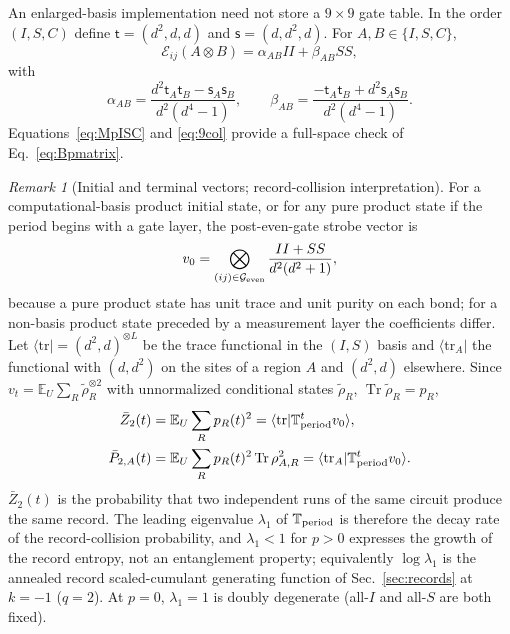 \documentclass[aps,prx,reprint,superscriptaddress,nobibnotes,longbibliography]{revtex4-2}
\theoremstyle{remark}
\newtheorem{remark}{Remark}
\newcommand{\Tr}{\operatorname{Tr}}
\newcommand{\E}{\mathbb E}
\newcommand{\Tper}{\mathbb T_{\rm period}}
\begin{document}
An enlarged-basis implementation need not store a $9\times9$ gate table.  In the order $(I,S,C)$ define $\mathsf t=(d^2,d,d)$ and $\mathsf s=(d,d^2,d)$.  For $A,B\in\{I,S,C\}$,
\begin{equation}
 \mathcal E_{ij}(A\otimes B)=\alpha_{AB}II+\beta_{AB}SS,
\end{equation}
with
\begin{equation}
 \alpha_{AB}=\frac{d^2\mathsf t_A\mathsf t_B-\mathsf s_A\mathsf s_B}{d^2(d^4-1)},\qquad
 \beta_{AB}=\frac{-\mathsf t_A\mathsf t_B+d^2\mathsf s_A\mathsf s_B}{d^2(d^4-1)}.
 \label{eq:9col}
\end{equation}
Equations~\eqref{eq:MpISC} and \eqref{eq:9col} provide a full-space check of Eq.~\eqref{eq:Bpmatrix}.

\begin{remark}[Initial and terminal vectors; record-collision interpretation]
\label{rem:v0}
For a computational-basis product initial state, or for any pure product state if the period begins with a gate layer, the post-even-gate strobe vector is
\begin{equation}
 v_0=\bigotimes_{(ij)\in\mathcal G_{\rm even}}\frac{II+SS}{d^2(d^2+1)},
 \label{eq:v0}
\end{equation}
because a pure product state has unit trace and unit purity on each bond; for a non-basis product state preceded by a measurement layer the coefficients differ.  Let $\langle\mathrm{tr}|=(d^2,d)^{\otimes L}$ be the trace functional in the $(I,S)$ basis and $\langle\mathrm{tr}_A|$ the functional with $(d,d^2)$ on the sites of a region $A$ and $(d^2,d)$ elsewhere.  Since $v_t=\E_U\sum_R\tilde\rho_R^{\otimes2}$ with unnormalized conditional states $\tilde\rho_R$, $\Tr\tilde\rho_R=p_R$,
\begin{align}
 \bar Z_2(t)&=\E_U\sum_Rp_R(t)^2=\langle\mathrm{tr}|\Tper^tv_0\rangle,\nonumber\\
 \bar P_{2,A}(t)&=\E_U\sum_Rp_R(t)^2\Tr\rho_{A,R}^2=\langle\mathrm{tr}_A|\Tper^tv_0\rangle.
 \label{eq:collision}
\end{align}
$\bar Z_2(t)$ is the probability that two independent runs of the same circuit produce the same record.  The leading eigenvalue $\lambda_1$ of $\Tper$ is therefore the decay rate of the record-collision probability, and $\lambda_1<1$ for $p>0$ expresses the growth of the record entropy, not an entanglement property; equivalently $\log\lambda_1$ is the annealed record scaled-cumulant generating function of Sec.~\ref{sec:records} at $k=-1$ ($q=2$).  At $p=0$, $\lambda_1=1$ is doubly degenerate (all-$I$ and all-$S$ are both fixed).
\end{remark}
\end{document}
